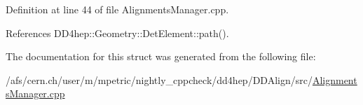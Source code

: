 Definition at line 44 of file Alignments\+Manager.\+cpp.



References D\+D4hep\+::\+Geometry\+::\+Det\+Element\+::path().



The documentation for this struct was generated from the following file\+:\begin{DoxyCompactItemize}
\item 
/afs/cern.\+ch/user/m/mpetric/nightly\+\_\+cppcheck/dd4hep/\+D\+D\+Align/src/\hyperlink{_alignments_manager_8cpp}{Alignments\+Manager.\+cpp}\end{DoxyCompactItemize}
